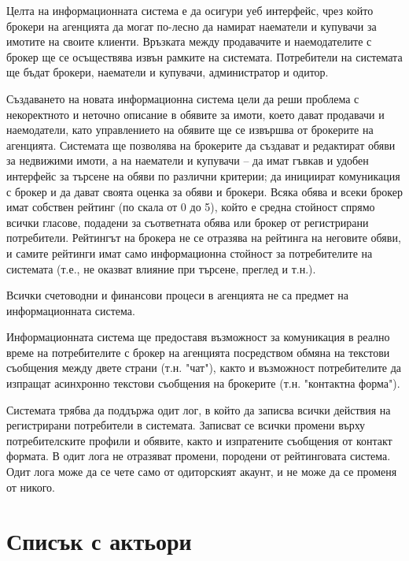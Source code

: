 \documentclass[a4paper]{article}
\begin{document}
Целта на информационната система е да осигури уеб интерфейс, чрез който брокери на агенцията да могат по-лесно да намират наематели и купувачи за имотите на своите клиенти. Връзката между продавачите и наемодателите с брокер ще се осъществява извън рамките на системата. Потребители на системата ще бъдат брокери, наематели и купувачи, администратор и одитор.

Създаването на новата информационна система цели да реши проблема с некоректното и неточно описание в обявите за имоти, което дават продавачи и наемодатели, като управлението на обявите ще се извършва от брокерите на агенцията. Системата ще позволява на брокерите да създават и редактират обяви за недвижими имоти, а на наематели и купувачи – да имат гъвкав и удобен интерфейс за търсене на обяви по различни критерии; да инициират комуникация с брокер и да дават своята оценка за обяви и брокери. Всяка обява и всеки брокер имат собствен рейтинг (по скала от 0 до 5), който е средна стойност спрямо всички гласове, подадени за съответната обява или брокер от регистрирани потребители. Рейтингът на брокера не се отразява на рейтинга на неговите обяви, и самите рейтинги имат само информационна стойност за потребителите на системата (т.е., не оказват влияние при търсене, преглед и т.н.).

Всички счетоводни и финансови процеси в агенцията не са предмет на информационната система.

Информационната система ще предоставя възможност за комуникация в реално време на потребителите с брокер на агенцията посредством обмяна на текстови съобщения между двете страни (т.н. "чат"), както и възможност потребителите да изпращат асинхронно текстови съобщения на брокерите (т.н. "контактна форма").

Системата трябва да поддържа одит лог, в който да записва всички действия на регистрирани потребители в системата. 
Записват се всички промени върху потребителските профили и обявите, както и изпратените съобщения от контакт формата.
В одит лога не отразяват промени, породени от рейтинговата система. Одит лога може да се чете само от одиторският акаунт, и не може да се променя от никого.

\section{Списък с актьори}
\end{document}
